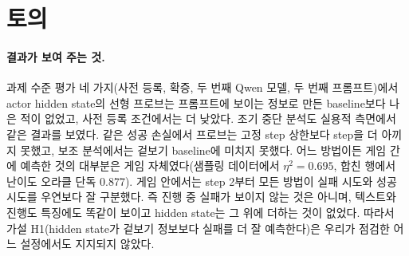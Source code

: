 \documentclass[11pt]{article}
\begin{document}
\section{토의}
\paragraph{결과가 보여 주는 것.} 과제 수준 평가 네 가지(사전 등록, 확증, 두 번째 Qwen 모델, 두 번째 프롬프트)에서 actor hidden state의 선형 프로브는 프롬프트에 보이는 정보로 만든 baseline보다 나은 적이 없었고, 사전 등록 조건에서는 더 낮았다.
조기 중단 분석도 실용적 측면에서 같은 결과를 보였다. 같은 성공 손실에서 프로브는 고정 step 상한보다 step을 더 아끼지 못했고, 보조 분석에서는 겉보기 baseline에 미치지 못했다.
어느 방법이든 게임 간에 예측한 것의 대부분은 게임 자체였다(샘플링 데이터에서 $\eta^2 = 0.695$, 합친 행에서 난이도 오라클 단독 0.877). 게임 안에서는 step 2부터 모든 방법이 실패 시도와 성공 시도를 우연보다 잘 구분했다.
즉 진행 중 실패가 보이지 않는 것은 아니며, 텍스트와 진행도 특징에도 똑같이 보이고 hidden state는 그 위에 더하는 것이 없었다.
따라서 가설 H1(hidden state가 겉보기 정보보다 실패를 더 잘 예측한다)은 우리가 점검한 어느 설정에서도 지지되지 않았다.
\end{document}

